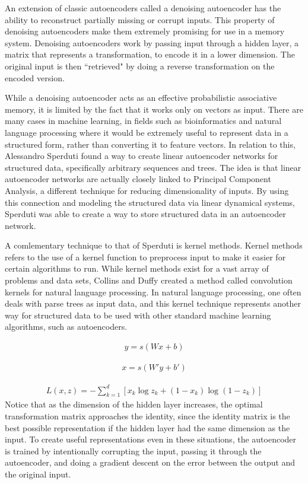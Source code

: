 \documentclass{sig-alternate}
\begin{document}
An extension of classic autoencoders called a denoising autoencoder has the ability to reconstruct partially missing or
corrupt inputs. This property of denoising autoencoders make them extremely promising for use
in a memory system. Denoising autoencoders work by passing input through a hidden layer, a matrix
that represents a transformation, to encode it in a lower dimension. The original input is then
``retrieved" by doing a reverse transformation on the encoded version. 

While a denoising autoencoder acts as an effective probabilistic associative memory, it is
limited by the fact that it works only on vectors as input. There are many cases in machine
learning, in fields such as bioinformatics and natural language processing where it would be 
extremely useful to represent data in a structured form, rather
than converting it to feature vectors. In relation to this, Alessandro Sperduti %
found a way to create linear autoencoder networks for structured data, specifically
arbitrary sequences and trees. The idea is that linear autoencoder networks are actually
closely linked to Principal Component Analysis, a different technique for reducing
dimensionality of inputs. By using this connection and modeling the structured data via
linear dynamical systems, Sperduti was able to create a way to store structured data
in an autoencoder network.

A comlementary technique to that of Sperduti is kernel methods. Kernel methods refers to the
use of a kernel function to preprocess input to make it easier for certain algorithms to run. 
While kernel methods exist for a vast array of problems and data sets, Collins and Duffy %
created a method called convolution kernels for natural language processing. In natural
language processing, one often deals with parse trees as input data, and this kernel technique
represents another way for structured data to be used with other standard machine learning
algorithms, such as autoencoders.

\begin{gather}
y = s(Wx + b)
\end{gather}


\begin{gather}
x = s(W' y  + b')
\end{gather}

\begin{gather}
L(x,z) = -\sum_{k=1}^d [x_k \log z_k + (1-x_k) \log( 1-z_k)]
\end{gather}
Notice that as the dimension
of the hidden layer increases, the optimal transformation matrix approaches the identity, since
the identity matrix is the best possible representation if the hidden layer had the same dimension
as the input. To create useful representations even in these situations, the autoencoder is trained
by intentionally corrupting the input, passing it through the autoencoder, and doing a gradient
descent on the error between the output and the original input.
\end{document}
